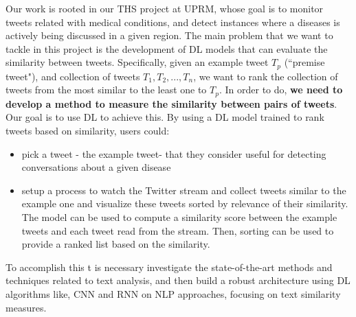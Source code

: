 \documentclass[12pt]{report}
\begin{document}
	Our work is rooted in our \ac{THS} project at UPRM, whose goal is to monitor tweets related with medical conditions, and detect instances where
a diseases is actively being discussed in a given region.
The main problem that we want to tackle in this project is the development of  \ac{DL} models that can evaluate the similarity between
tweets. Specifically, given an example tweet $T_p$ (``premise tweet"), and  collection of tweets $T_1, T_2, ..., T_n$, we want to rank the collection of tweets
from the most similar to the least one to $T_p$. In order to do, {\bf we need to develop a method to measure the similarity between pairs of 
	tweets}. Our goal is to use \ac{DL} to achieve this. 
By using a \ac{DL} model trained to rank tweets based on similarity, users could: 
\begin{itemize}
	\item pick a tweet - the example tweet- that they consider useful for detecting conversations about a given disease 
	\item setup a process to watch the Twitter stream and collect tweets similar  to the example one and visualize these tweets  sorted by 
	relevance of their similarity. The model can be used to compute a similarity score between the example tweets and each tweet read from the stream. Then, sorting can be used to provide a ranked list based on the similarity.
\end{itemize} 

To accomplish this t is necessary investigate the state-of-the-art methods and techniques related to text analysis, and then build a robust architecture using \ac{DL} algorithms like, \ac{CNN} and \ac{RNN} on \ac{NLP} approaches,  focusing on text similarity measures.
\end{document}
